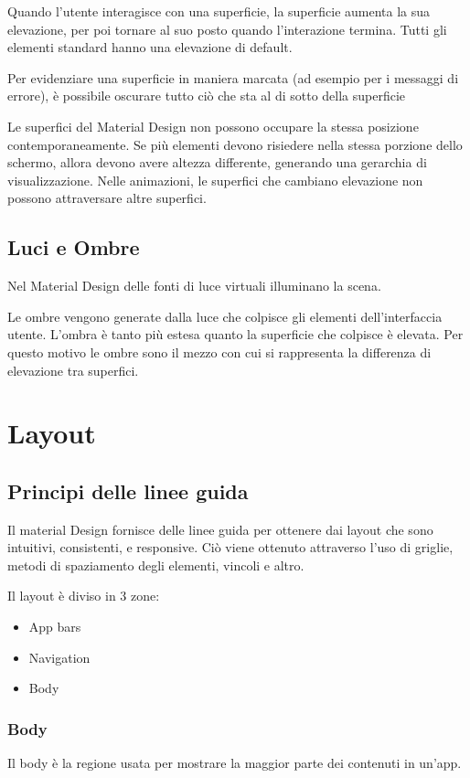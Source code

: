 \documentclass[12pt, a4paper]{report}
\begin{document}
		Quando l'utente interagisce con una superficie, la superficie aumenta la sua elevazione, per poi tornare al suo posto quando l'interazione termina. Tutti gli elementi standard hanno una elevazione di default.

		Per evidenziare una superficie in maniera marcata (ad esempio per i messaggi di errore), è possibile oscurare tutto ciò che sta al di sotto della superficie
	
		Le superfici del Material Design non possono occupare la stessa posizione contemporaneamente. Se più elementi devono risiedere nella stessa porzione dello schermo, allora devono avere altezza differente, generando una gerarchia di visualizzazione. Nelle animazioni, le superfici che cambiano elevazione non possono attraversare altre superfici.

		\subsection{Luci e Ombre}
		Nel Material Design delle fonti di luce virtuali illuminano la scena.
		
		Le ombre vengono generate dalla luce che colpisce gli elementi dell'interfaccia utente. L'ombra è tanto più estesa quanto la superficie che colpisce è elevata. Per questo motivo le ombre sono il mezzo con cui si rappresenta la differenza di elevazione tra superfici.


	\section{Layout}
	\subsection{Principi delle linee guida}
		Il material Design fornisce delle linee guida per ottenere dai layout che sono intuitivi, consistenti, e responsive. Ciò viene ottenuto attraverso l'uso di griglie, metodi di spaziamento degli elementi, vincoli e altro.\cite{layout_start}
		
		Il layout è diviso in 3 zone:
		\begin{itemize}
			\item App bars
			\item Navigation
			\item Body
		  \end{itemize}
		\subsubsection{Body}
		  Il body è la regione usata per mostrare la maggior parte dei contenuti in un'app.
		  
\end{document}
